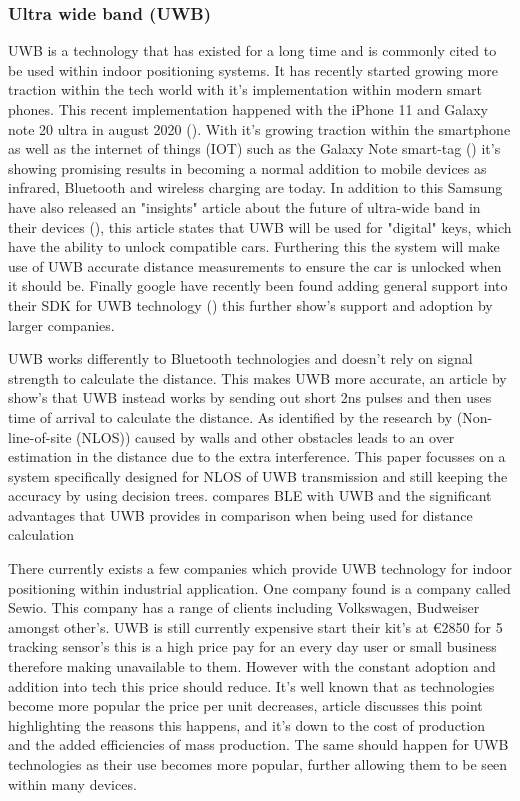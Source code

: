 \subsubsection{Ultra wide band (UWB)}
UWB is a technology that has existed for a long time and is commonly cited to be used within indoor positioning systems. It has recently started growing more traction within the tech world with it's implementation within modern smart phones. This recent implementation happened with the iPhone 11 and Galaxy note 20 ultra in august 2020 (\cite{vyas_2021_google}). With it's growing traction within the smartphone as well as the internet of things (IOT) such as the Galaxy Note smart-tag (\cite{samsung_2021_introducing}) it's showing promising results in becoming a normal addition to mobile devices as infrared, Bluetooth and wireless charging are today. In addition to this Samsung have also released an "insights" article about the future of ultra-wide band in their devices (\cite{samsung_2021_what}), this article states that UWB will be used for "digital" keys, which have the ability to unlock compatible cars. Furthering this the system will make use of UWB accurate distance measurements to ensure the car is unlocked when it should be. Finally google have recently been found adding general support into their SDK for UWB technology (\cite{vyas_2021_google}) this further show's support and adoption by larger companies. 

UWB works differently to Bluetooth technologies and doesn't rely on signal strength to calculate the distance. This makes UWB more accurate, an article by \cite{connell_2015_stackpath} show's that UWB instead works by sending out short 2ns pulses and then uses time of arrival to calculate the distance. As identified by the research by \cite{musa_2019_a} (Non-line-of-site (NLOS)) caused by walls and other obstacles leads to an over estimation in the distance due to the extra interference. This paper focusses on a system specifically designed for NLOS of UWB transmission and still keeping the accuracy by using decision trees. \cite{comer_uwb_vs_ble} compares BLE with UWB and the significant advantages that UWB provides in comparison when being used for distance calculation 

There currently exists a few companies which provide UWB technology for indoor positioning within industrial application. One company found is a company called Sewio. This company has a range of clients including Volkswagen, Budweiser amongst other’s. UWB is still currently expensive \cite{sewio_2021_realtime} start their kit's at €2850 for 5 tracking sensor's this is a high price pay for an every day user or small business therefore making unavailable to them. However with the constant adoption and addition into tech this price should reduce. It's well known that as technologies become more popular the price per unit decreases, \cite{tuovila_2021_marginal} article discusses this point highlighting the reasons this happens, and it's down to the cost of production and the added efficiencies of mass production. The same should happen for UWB technologies as their use becomes more popular, further allowing them to be seen within many devices. 

